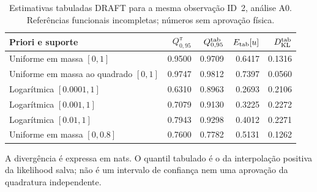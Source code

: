 \begin{table}[htbp]
\centering\small
\caption{Estimativas tabuladas DRAFT para a mesma observação ID~2, análise A0. Referências funcionais incompletas; números sem aprovação física.}
\label{tab:d2-draft-prioris}
\begin{tabular}{@{}lrrrr@{}}\toprule
Priori e suporte & $Q_{0,95}^{\pi}$ & $Q_{0,95}^{\rm tab}$ & $E_{\rm tab}[u]$ & $D_{\rm KL}^{\rm tab}$ \\
\midrule
Uniforme em massa $[0,1]$ & 0.9500 & 0.9709 & 0.6417 & 0.1316 \\
Uniforme em massa ao quadrado $[0,1]$ & 0.9747 & 0.9812 & 0.7397 & 0.0560 \\
Logarítmica $[0.0001,1]$ & 0.6310 & 0.8963 & 0.2693 & 0.2106 \\
Logarítmica $[0.001,1]$ & 0.7079 & 0.9130 & 0.3225 & 0.2272 \\
Logarítmica $[0.01,1]$ & 0.7943 & 0.9298 & 0.4012 & 0.2271 \\
Uniforme em massa $[0,0.8]$ & 0.7600 & 0.7782 & 0.5131 & 0.1262 \\
\bottomrule\end{tabular}
\end{table}
\noindent A divergência é expressa em nats. O quantil tabulado é o da interpolação positiva da likelihood salva; não é um intervalo de confiança nem uma aprovação da quadratura independente.
